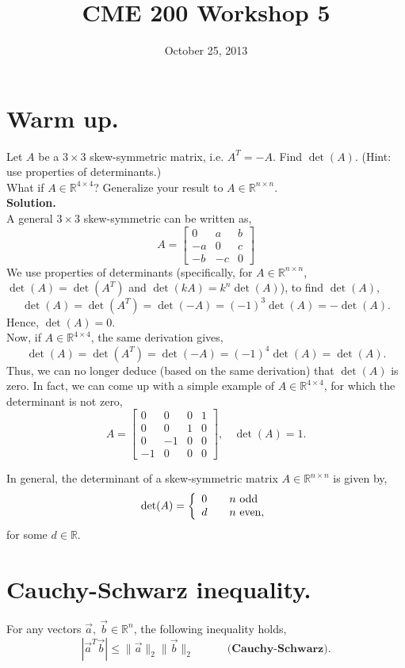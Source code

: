 \documentclass{article}
\title{CME 200 Workshop 5}
\date{October 25, 2013}
\newcommand{\R}{\ensuremath{\mathbb{R}}}
\newcommand{\bva}{\vec a}
\newcommand{\bvb}{\vec b}
\newcommand{\x}{\times}
\newcommand{\norm}[1]{\|#1\|}
\newcommand{\normII}[1]{\norm{#1}_2}
\newcommand{\bmat}[1]{\begin{bmatrix}#1\end{bmatrix}}
\begin{document}
\maketitle
\thispagestyle{fancy}


\section{Warm up.}
Let $A$ be a $3\x3$ skew-symmetric matrix, i.e. $A^T = -A$. Find $\det(A)$. (Hint: use properties of determinants.) \\
What if $A \in \R^{4\x 4}$? Generalize your result to $A\in \R^{n\x n}$.
\\

\textbf{Solution.}\\
A general $3\x 3$ skew-symmetric can be written as,
\[ A = \begin{bmatrix}
0 & a & b \\
-a & 0 & c \\
-b & -c & 0
\end{bmatrix} \]
We use properties of determinants (specifically, for $A \in \R^{n\x n}$, $\det(A) = \det(A^T)$ and $\det(kA) = k^n \det(A)$), to find $\det(A)$,
\[ \det(A) = \det(A^T) = \det(-A) = (-1)^3\det(A) = - \det(A). \]
Hence, $\det(A) = 0$.\\
Now, if $A \in \R^{4\x 4}$, the same derivation gives,
\[ \det(A) = \det(A^T) = \det(-A) = (-1)^4\det(A) = \det(A). \]
Thus, we can no longer deduce (based on the same derivation) that $\det(A)$ is zero. In fact, we can come up with a simple example of $A \in \R^{4 \x 4}$, for which the determinant is not zero,
\[ A = \bmat{
0 & 0 & 0 & 1 \\
0 & 0 & 1 & 0 \\
0 & -1 & 0 & 0 \\
-1 & 0 & 0 & 0 }, \ \ \ \ \det(A)=1. \]

In general, the determinant of a skew-symmetric matrix $A \in \R^{n\x n}$ is given by, 
\[ \det(A) =  \left\{ \begin{array}{l l} 0 & \quad n \text{ odd}\\
							      		d &\quad n \text{ even},
\end{array} \right. \]
for some $d\in \R$.
\\

\section*{Cauchy-Schwarz inequality.}
For any vectors $\bva,\ \bvb \in \R^n$, the following inequality holds,
\[|\vec a^T \vec b| \le \normII{\vec a} \normII{\vec b} \quad \quad \quad \textbf{(Cauchy-Schwarz)}. \]
\\
\end{document}
